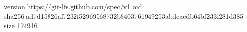 version https://git-lfs.github.com/spec/v1
oid sha256:ad7d15926af7232f52969568732b8403761949253abdcacdb64bf233f281d385
size 174916
